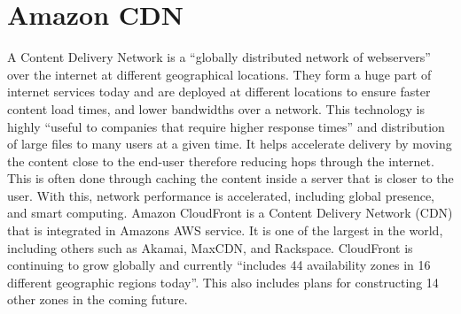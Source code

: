 \section{Amazon CDN}

A Content Delivery Network is a “globally distributed network of webservers” \cite{Content Delivery Network} over the internet at different geographical locations. They form a huge part of internet services today and are deployed at different locations to ensure faster content load times, and lower bandwidths over a network. This technology is highly “useful to companies that require higher response times”\cite{Amazon CloudFront} and distribution of large files to many users at a given time. It helps accelerate delivery by moving the content close to the end-user therefore reducing hops through the internet. This is often done through caching the content inside a server that is closer to the user. With this, network performance is accelerated, including global presence, and smart computing. Amazon CloudFront is a Content Delivery Network (CDN) that is integrated in Amazons AWS service. It is one of the largest in the world, including others such as Akamai, MaxCDN, and Rackspace. CloudFront is continuing to grow globally and currently “includes 44 availability zones in 16 different geographic regions today”\cite{Amazon CloudFront}. This also includes plans for constructing 14 other zones in the coming future.

